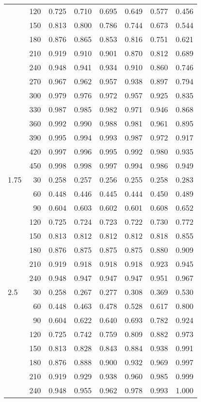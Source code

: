 \documentclass[bimj,fleqn]{w-art}\usepackage[]{graphicx}\usepackage[]{color}
\theoremstyle{plain}
\theoremstyle{definition}
\begin{document}
\begin{table}[ht]
\begin{tabular}{lrrrrrrr}
   & 120 & 0.725 & 0.710 & 0.695 & 0.649 & 0.577 & 0.456 \\ 
   & 150 & 0.813 & 0.800 & 0.786 & 0.744 & 0.673 & 0.544 \\ 
   & 180 & 0.876 & 0.865 & 0.853 & 0.816 & 0.751 & 0.621 \\ 
   & 210 & 0.919 & 0.910 & 0.901 & 0.870 & 0.812 & 0.689 \\ 
   & 240 & 0.948 & 0.941 & 0.934 & 0.910 & 0.860 & 0.746 \\ 
   & 270 & 0.967 & 0.962 & 0.957 & 0.938 & 0.897 & 0.794 \\ 
   & 300 & 0.979 & 0.976 & 0.972 & 0.957 & 0.925 & 0.835 \\ 
   & 330 & 0.987 & 0.985 & 0.982 & 0.971 & 0.946 & 0.868 \\ 
   & 360 & 0.992 & 0.990 & 0.988 & 0.981 & 0.961 & 0.895 \\ 
   & 390 & 0.995 & 0.994 & 0.993 & 0.987 & 0.972 & 0.917 \\ 
   & 420 & 0.997 & 0.996 & 0.995 & 0.992 & 0.980 & 0.935 \\ 
   & 450 & 0.998 & 0.998 & 0.997 & 0.994 & 0.986 & 0.949 \\ 
  1.75 & 30 & 0.258 & 0.257 & 0.256 & 0.255 & 0.258 & 0.283 \\ 
   & 60 & 0.448 & 0.446 & 0.445 & 0.444 & 0.450 & 0.489 \\ 
   & 90 & 0.604 & 0.603 & 0.602 & 0.601 & 0.608 & 0.652 \\ 
   & 120 & 0.725 & 0.724 & 0.723 & 0.722 & 0.730 & 0.772 \\ 
   & 150 & 0.813 & 0.812 & 0.812 & 0.812 & 0.818 & 0.855 \\ 
   & 180 & 0.876 & 0.875 & 0.875 & 0.875 & 0.880 & 0.909 \\ 
   & 210 & 0.919 & 0.918 & 0.918 & 0.918 & 0.923 & 0.945 \\ 
   & 240 & 0.948 & 0.947 & 0.947 & 0.947 & 0.951 & 0.967 \\ 
  2.5 & 30 & 0.258 & 0.267 & 0.277 & 0.308 & 0.369 & 0.530 \\ 
   & 60 & 0.448 & 0.463 & 0.478 & 0.528 & 0.617 & 0.800 \\ 
   & 90 & 0.604 & 0.622 & 0.640 & 0.693 & 0.782 & 0.924 \\ 
   & 120 & 0.725 & 0.742 & 0.759 & 0.809 & 0.882 & 0.973 \\ 
   & 150 & 0.813 & 0.828 & 0.843 & 0.884 & 0.938 & 0.991 \\ 
   & 180 & 0.876 & 0.888 & 0.900 & 0.932 & 0.969 & 0.997 \\ 
   & 210 & 0.919 & 0.929 & 0.938 & 0.960 & 0.985 & 0.999 \\ 
   & 240 & 0.948 & 0.955 & 0.962 & 0.978 & 0.993 & 1.000 \\ 
   \hline
\end{tabular}
\end{table}
\end{document}
